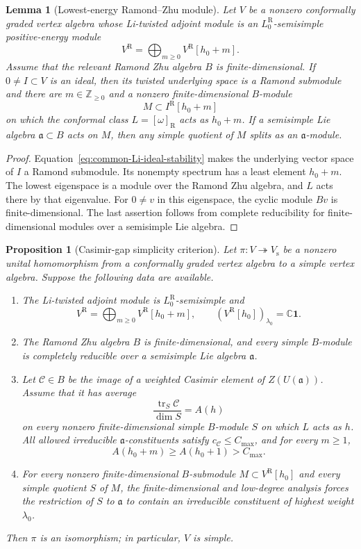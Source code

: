 \documentclass[11pt,reqno]{amsart}
\newtheorem{lemma}[theorem]{Lemma}
\newtheorem{proposition}[theorem]{Proposition}
\theoremstyle{definition}
\theoremstyle{remark}
\begin{document}
\begin{lemma}[Lowest-energy Ramond--Zhu module]
\label{lem:common-lowest-Ramond-Zhu-module}
Let $V$ be a nonzero conformally graded vertex algebra whose Li-twisted
adjoint module is an $L_0^{\mathrm R}$-semisimple positive-energy module
\[
 V^{\mathrm R}=\bigoplus_{m\ge0}V^{\mathrm R}[h_0+m].
\]
Assume that the relevant Ramond Zhu algebra $B$ is finite-dimensional.
If $0\ne I\subset V$ is an ideal, then its twisted underlying space is a
Ramond submodule and there are $m\in\mathbb Z_{\ge0}$ and a nonzero
finite-dimensional $B$-module
\[
 M\subset I^{\mathrm R}[h_0+m]
\]
on which the conformal class $L=[\omega]_{\mathrm R}$ acts as
$h_0+m$.  If a semisimple Lie algebra $\mathfrak a\subset B$ acts on
$M$, then any simple quotient of $M$ splits as an $\mathfrak a$-module.
\end{lemma}

\begin{proof}
Equation~\eqref{eq:common-Li-ideal-stability} makes the underlying vector
space of $I$ a Ramond submodule.  Its nonempty spectrum has a least element
$h_0+m$.  The lowest eigenspace is a module over the Ramond Zhu algebra,
and $L$ acts there by that eigenvalue.  For $0\ne v$ in this eigenspace,
the cyclic module $Bv$ is finite-dimensional.  The last assertion follows
from complete reducibility for finite-dimensional modules over a semisimple
Lie algebra.
\end{proof}

\begin{proposition}[Casimir-gap simplicity criterion]
\label{prop:common-Casimir-gap-simplicity}
Let $\pi:V\twoheadrightarrow V_{\mathrm s}$ be a nonzero unital
homomorphism from a conformally graded vertex algebra to a simple vertex
algebra.  Suppose the following data are available.
\begin{enumerate}
\item The Li-twisted adjoint module is $L_0^{\mathrm R}$-semisimple and
\[
 V^{\mathrm R}=\bigoplus_{m\ge0}V^{\mathrm R}[h_0+m],
 \qquad
 (V^{\mathrm R}[h_0])_{\lambda_0}=\mathbb C\mathbf1.
\]
\item The Ramond Zhu algebra $B$ is finite-dimensional, and every simple
$B$-module is completely reducible over a semisimple Lie algebra
$\mathfrak a$.
\item Let $\mathcal C\in B$ be the image of a weighted Casimir element of
$Z(U(\mathfrak a))$.  Assume that it has average
\[
 \frac{\operatorname{tr}_S\mathcal C}{\dim S}=A(h)
\]
on every nonzero finite-dimensional simple $B$-module $S$ on which $L$
acts as $h$.  All allowed irreducible $\mathfrak a$-constituents satisfy
$c_{\mathcal C}\le C_{\max}$, and for every $m\ge1$,
\[
 A(h_0+m)\ge A(h_0+1)>C_{\max}.
\]
\item For every nonzero finite-dimensional $B$-submodule
$M\subset V^{\mathrm R}[h_0]$ and every simple quotient $S$ of $M$, the
finite-dimensional and low-degree analysis forces the restriction of $S$
to $\mathfrak a$ to contain an irreducible constituent of highest weight
$\lambda_0$.
\end{enumerate}
Then $\pi$ is an isomorphism; in particular, $V$ is simple.
\end{proposition}
\end{document}
